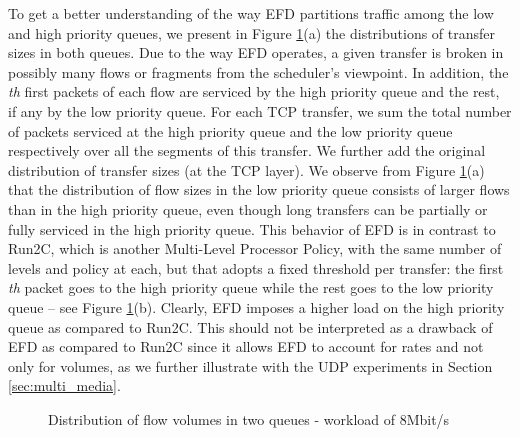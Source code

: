 \documentclass[preprint,12pt]{elsarticle}
\begin{document}
To get a better understanding of the way EFD partitions traffic among the low and high priority queues, we present in Figure \ref{fig:flow_dist}(a) the distributions of transfer sizes in both queues. Due to the way EFD operates, a given transfer is broken in possibly many flows or fragments from the scheduler's viewpoint. In addition, the \textit{th} first packets of each flow are serviced by the high priority queue and the rest, if any by the low priority queue. For each TCP transfer, we sum the total number of packets serviced at the high priority queue and the low priority queue respectively over all the segments of this transfer. We further add the original distribution of transfer sizes (at the TCP layer). We observe from  Figure \ref{fig:flow_dist}(a) that the distribution of flow sizes  in the low priority queue consists of larger flows than in the high priority queue, even though long transfers can be partially or fully serviced in the high priority queue. This behavior of EFD is in contrast to Run2C, which is another Multi-Level Processor Policy, with the same number of levels and policy at each, but that adopts a fixed threshold per transfer: the first \textit{th} packet goes to the high priority queue while the rest goes to the low priority queue -- see  Figure \ref{fig:flow_dist}(b). Clearly, EFD imposes a higher load on the high priority queue as compared to Run2C. This should not be interpreted as a drawback of EFD as compared to Run2C since it allows EFD to account for rates and not only for volumes, as we further illustrate with the UDP experiments in Section \ref{sec:multi_media}. 

\begin{figure}[ht]
  \centering
  \caption{Distribution of flow volumes in two queues - workload of 8Mbit/s}
  \label{fig:flow_dist}
\end{figure}
\end{document}
